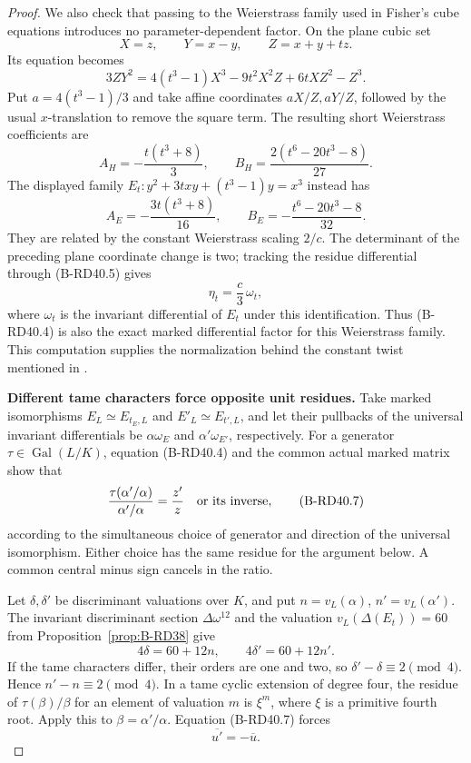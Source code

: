 \begin{proof}
We also check that passing to the Weierstrass family used in
Fisher's cube equations introduces no parameter-dependent factor.
On the plane cubic set
\[
              X=z,\qquad Y=x-y,\qquad Z=x+y+tz.
\]
Its equation becomes
\[
 3ZY^2=4(t^3-1)X^3-9t^2X^2Z+6tXZ^2-Z^3.
                                                        \tag{B-RD40.5}
\]
Put $a=4(t^3-1)/3$ and take affine coordinates $aX/Z,aY/Z$,
followed by the usual $x$-translation to remove the square term.
The resulting short Weierstrass coefficients are
\[
 A_H=-\frac{t(t^3+8)}3,\qquad
 B_H=\frac{2(t^6-20t^3-8)}{27}.
\]
The displayed family $E_t:y^2+3txy+(t^3-1)y=x^3$ instead has
\[
 A_E=-\frac{3t(t^3+8)}{16},\qquad
 B_E=-\frac{t^6-20t^3-8}{32}.
\]
They are related by the constant Weierstrass scaling $2/c$.
The determinant of the preceding plane coordinate change is two;
tracking the residue differential through (B-RD40.5) gives
\[
                         \eta_t=\frac c3\,\omega_t,
                                                        \tag{B-RD40.6}
\]
where $\omega_t$ is the invariant differential of $E_t$ under this
identification. Thus (B-RD40.4) is also the exact marked differential
factor for this Weierstrass family. This computation supplies the
normalization behind the constant twist mentioned in
\citet[Lemma~4.2(i), p.~8]{Fisher2015Nine}.

\par\smallskip\noindent\textbf{Different tame characters force opposite unit residues.}
Take marked isomorphisms $E_L\simeq E_{t_E,L}$ and
$E'_L\simeq E_{t',L}$, and let their pullbacks of the universal
invariant differentials be $\alpha\omega_E$ and
$\alpha'\omega_{E'}$, respectively. For a generator
$\tau\in\operatorname{Gal}(L/K)$, equation (B-RD40.4) and the
common actual marked matrix show that
\[
       \frac{\tau(\alpha'/\alpha)}{\alpha'/\alpha}
                =\frac{z'}z
          \quad\hbox{or its inverse},
                                                        \tag{B-RD40.7}
\]
according to the simultaneous choice of generator and direction of
the universal isomorphism. Either choice has the same residue for
the argument below. A common central minus sign cancels in the ratio.

Let $\delta,\delta'$ be discriminant valuations over $K$, and
put $n=v_L(\alpha)$, $n'=v_L(\alpha')$. The invariant discriminant
section $\Delta\omega^{12}$ and the valuation
$v_L(\Delta(E_t))=60$ from Proposition~\ref{prop:B-RD38} give
\[
                 4\delta=60+12n,\qquad
                 4\delta'=60+12n'.
                                                        \tag{B-RD40.8}
\]
If the tame characters differ, their orders are one and two, so
$\delta'-\delta\equiv2\pmod4$. Hence
$n'-n\equiv2\pmod4$. In a tame cyclic extension of degree four,
the residue of $\tau(\beta)/\beta$ for an element of valuation
$m$ is $\xi^m$, where $\xi$ is a primitive fourth root.
Apply this to $\beta=\alpha'/\alpha$. Equation (B-RD40.7) forces
\[
                           \overline{u'}=-\overline u.
                                                        \tag{B-RD40.9}
\]


\end{proof}
